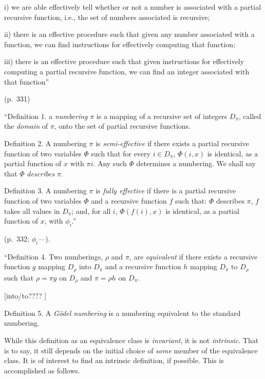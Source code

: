 \documentclass[12pt]{article}
\theoremstyle{remark}
\newcommand*{\gl}{\nobreak\hskip1pt}
\DeclareRobustCommand*{\emdash}{\gl\hbox{---}\gl}
\begin{document}
\begin{thebibliography}{99}
{{i) we are able effectively tell whether or not a number is associated with a partial recursive function, i.e., the set of numbers associated is recursive;

ii) there is an effective procedure such that given any number associated with a function, we can find instructions for effectively computing that function;

iii) there is an effective procedure such that given instructions for effectively computing a partial recursive function, we can find an integer associated with that function''

(p.~331)

``Definition 1. a \emph{numbering} $\pi$ is a mapping of a recursive set of integers $D_\pi$, called the \emph{domain} of $\pi$, onto the set of partial recursive functions. 

Definition 2. A numbering $\pi$ is \emph{semi-effective} if there exists a partial recursive function of two variables $\Phi$ such that for every $i\in D_{\pi}$, $\Phi(i,x)$ is identical, as a partial function of $x$ with $\pi i$. Any such $\Phi$ determines a numbering. We shall say that $\Phi$ \emph{describes} $\pi$.

Definition 3. A numbering $\pi$ is \emph{fully effective} if there is a partial recursive function of two variables $\Phi$ and a recursive function $f$ such that: $\Phi$ describes $\pi$, $f$ takes all values in $D_\pi$; and, for all $i$, $\Phi(f(i), x)$ is identical, as a partial function of $x$, with $\phi_i$.''  

(p.~332;  $\phi_i$\emdash {}).

``Definition 4. Two numberings, $\rho$ and $\pi$, are \emph{equivalent} if there exists a recursive function $g$ mapping $D_\rho$ into $D_\pi$ and a recursive function $h$ mapping $D_{\pi}$ to $D_{\rho}$ such that $\rho=\pi g$ on $D_{\rho}$ and $\pi = \rho h$ on $D_{\pi}$.

[into/to???? ]

Definition 5. A \emph{G\"odel numbering} is a numbering equivalent to the standard numbering.

While this definition as an equivalence class is \emph{invariant}, it is not \emph{intrinsic}. That is to say, it still depends on the initial choice of \emph{some} member of the equivalence class. It is of interest to find an intrinsic definition, if possible. This is accomplished as follows.

}}
\end{thebibliography}
\end{document}
